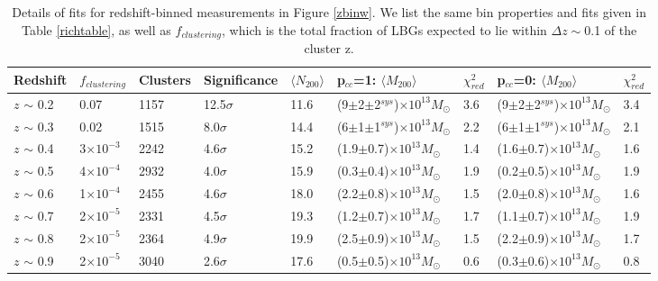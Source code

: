 \begin{landscape}
\begin{table}
  \centering
    \caption[Magnification Results for Redshift-Binned Clusters]{Details of fits for redshift-binned measurements in Figure \ref{zbinw}. We list the same bin properties and fits given in Table \ref{richtable}, as well as $f_{clustering}$, which is the total fraction of \ac{LBG}s expected to lie within $\Delta z \sim$0.1 of the cluster z.}
    \label{ztable}
    \begin{tabular}{lllllllll}
      \hline
      Redshift & $f_{clustering}$ & Clusters & Significance & $\langle N_{200} \rangle$ & p$_{cc}$=1: $\langle M_{200} \rangle$ & $\chi^2_{red}$  & p$_{cc}$=0: $\langle M_{200} \rangle$ & $\chi^2_{red}$ \\ \hline
      $z$ $\sim$ 0.2 & 0.07 & 1157 & 12.5$\sigma$ & 11.6 & (9$\pm$2$\pm$2$^{sys}$)$\times10^{13} M_{\odot}$ & 3.6 & (9$\pm$2$\pm$2$^{sys}$)$\times10^{13} M_{\odot}$ & 3.4  \\
      $z$ $\sim$ 0.3 & 0.02 & 1515 & 8.0$\sigma$ & 14.4 & (6$\pm$1$\pm$1$^{sys}$)$\times10^{13} M_{\odot}$ & 2.2 & (6$\pm$1$\pm$1$^{sys}$)$\times10^{13} M_{\odot}$ & 2.1  \\
      $z$ $\sim$ 0.4 & 3$\times10^{-3}$ & 2242 & 4.6$\sigma$ & 15.2 & (1.9$\pm$0.7)$\times10^{13} M_{\odot}$ & 1.4 & (1.6$\pm$0.7)$\times10^{13} M_{\odot}$ & 1.6  \\
      $z$ $\sim$ 0.5 & 4$\times10^{-4}$ & 2932 & 4.0$\sigma$ & 15.9 & (0.3$\pm$0.4)$\times10^{13} M_{\odot}$ & 1.9 & (0.2$\pm$0.5)$\times10^{13} M_{\odot}$ & 1.9  \\
      $z$ $\sim$ 0.6 & 1$\times10^{-4}$ & 2455 & 4.6$\sigma$ & 18.0 & (2.2$\pm$0.8)$\times10^{13} M_{\odot}$ & 1.5 & (2.0$\pm$0.8)$\times10^{13} M_{\odot}$ & 1.6  \\
      $z$ $\sim$ 0.7 & 2$\times10^{-5}$ & 2331 & 4.5$\sigma$ & 19.3 & (1.2$\pm$0.7)$\times10^{13} M_{\odot}$ & 1.7 & (1.1$\pm$0.7)$\times10^{13} M_{\odot}$ & 1.9  \\
      $z$ $\sim$ 0.8 & 2$\times10^{-5}$ & 2364 & 4.9$\sigma$ & 19.9 & (2.5$\pm$0.9)$\times10^{13} M_{\odot}$ & 1.5 & (2.2$\pm$0.9)$\times10^{13} M_{\odot}$ & 1.7  \\ 
      $z$ $\sim$ 0.9 & 2$\times10^{-5}$ & 3040 & 2.6$\sigma$ & 17.6 & (0.5$\pm$0.5)$\times10^{13} M_{\odot}$ & 0.6 & (0.3$\pm$0.6)$\times10^{13} M_{\odot}$ & 0.8  \\
      \hline
    \end{tabular}
\end{table}
\end{landscape}


